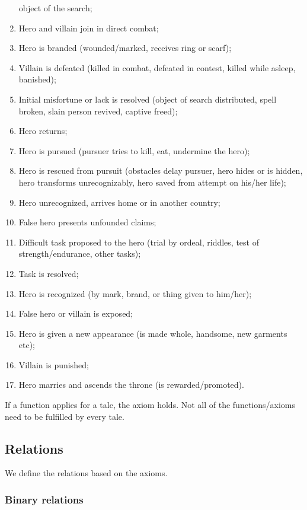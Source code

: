 \documentclass[10pt,a4paper]{article}
\begin{document}
\begin{enumerate}
object of the search;
	\item  Hero and villain join in direct combat;
	\item  Hero is branded (wounded/marked, receives ring or scarf);
	 \item  Villain is defeated (killed in combat, defeated in contest, killed
while asleep, banished);
 	\item  Initial misfortune or lack is resolved (object of search
distributed, spell broken, slain person revived, captive freed);
 	\item  Hero returns;
	\item  Hero is pursued (pursuer tries to kill, eat, undermine the hero);
	\item   Hero is rescued from pursuit (obstacles delay pursuer, hero
hides or is hidden, hero transforms unrecognizably, hero saved
from attempt on his/her life);
	\item  Hero unrecognized, arrives home or in another country;
 	\item  False hero presents unfounded claims;
 	\item  Difficult task proposed to the hero (trial by ordeal, riddles, test
of strength/endurance, other tasks);
 	\item  Task is resolved;
 \item  Hero is recognized (by mark, brand, or thing given to
him/her);
 \item False hero or villain is exposed;
 \item  Hero is given a new appearance (is made whole, handsome,
new garments etc);
 \item Villain is punished;
 \item  Hero marries and ascends the throne (is rewarded/promoted).
\end{enumerate}

If a function applies for a tale, the axiom holds. Not all of the functions/axioms need to be fulfilled by every tale.    

\subsection{Relations}
We define the relations based on the axioms. 
	\subsubsection{Binary relations} 
\end{document}
